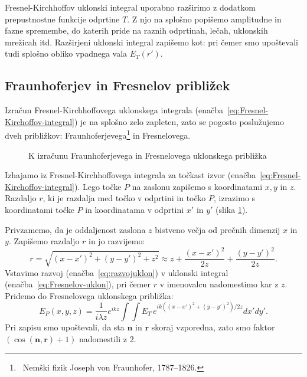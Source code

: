Fresnel-Kirchhoffov uklonski integral uporabno razširimo z dodatkom prepustnostne funkcije odprtine $T$.
Z njo na splošno popišemo amplitudne in fazne spremembe, do katerih pride na raznih 
odprtinah, lečah, uklonskih mrežicah itd. Razširjeni uklonski integral zapišemo kot:
pri čemer smo upoštevali tudi splošno obliko vpadnega vala $E_T(r')$.
\newpage
\subsection*{Fraunhoferjev in Fresnelov približek}
\label{FFuklon}
Izračun Fresnel-Kirchhoffovega uklonskega integrala (enačba~\ref{eq:Fresnel-Kirchoffov-integral}) 
je na splošno zelo zapleten, zato se 
pogosto poslužujemo dveh približkov: Fraunhoferjevega\footnote{~Nemški fizik 
Joseph von Fraunhofer, 1787--1826.} in Fresnelovega. 
\begin{figure}[ht]
\centering {} 
  
\caption{K izračunu Fraunhoferjevega in Fresnelovega uklonskega približka}
\label{fig:Uklon-koordinate}
\end{figure}

Izhajamo iz Fresnel-Kirchhoffovega integrala za točkast izvor
(enačba~\ref{eq:Fresnel-Kirchoffov-integral}). Lego točke $P$ na zaslonu zapišemo 
s koordinatami $x,y$ in $z$. Razdaljo $r$, ki je razdalja med točko v odprtini
in točko $P$, izrazimo s koordinatami točke $P$ in koordinatama v odprtini $x'$ in $y'$ 
(slika \ref{fig:Uklon-koordinate}). 
 
Privzamemo,
da je oddaljenost zaslona $z$ bistveno večja od prečnih dimenzij $x$ in $y$. 
Zapišemo razdaljo $r$ in jo razvijemo:
\begin{equation}
r = \sqrt{(x-x')^2+(y-y')^2 + z^2} \approx z + \frac{(x-x')^2}{2z} +\frac{(y-y')^2}{2z}.
\label{eq:razvojuklon}
\end{equation}
Vstavimo razvoj (enačba~\ref{eq:razvojuklon}) v uklonski integral (enačba~\ref{eq:Fresnelov-uklon}), 
pri čemer $r$ v imenovalcu nadomestimo kar z $z$. 
Pridemo do Fresnelovega uklonskega približka:
\begin{equation}
\label{eq:FresnelApprox}
E_P(x,y,z) =  \frac{1}{i \lambda z } e^{i k z}\int \int E_T\, e^{ik ((x-x')^2+(y-y')^2)/2z} dx' dy'.
\end{equation}
Pri zapisu smo upoštevali, da sta $\mathbf{n}$ in $\mathbf{r}$ 
skoraj vzporedna, zato smo faktor
$\left(\cos(\mathbf{n},\mathbf{r})+1\right)$ nadomestili z 2.

